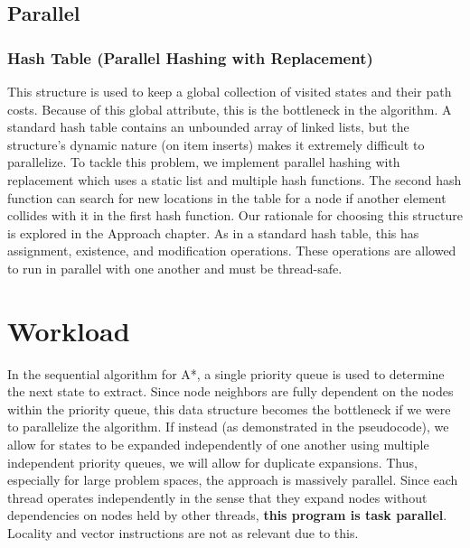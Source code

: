 \subsection{Parallel}
\subsubsection{Hash Table (Parallel Hashing with Replacement)\cite{paper}}
This structure is used to keep a global collection of visited states and their path costs. Because of this global attribute, this is the bottleneck in the algorithm. A standard hash table contains an unbounded array of linked lists, but the structure's dynamic nature (on item inserts) makes it extremely difficult to parallelize. To tackle this problem, we implement parallel hashing with replacement\cite{paper} which uses a static list and multiple hash functions. The second hash function can search for new locations in the table for a node if another element collides with it in the first hash function. Our rationale for choosing this structure is explored in the Approach chapter. As in a standard hash table, this has assignment, existence, and modification operations. These operations are allowed to run in parallel with one another and must be thread-safe.

\section{Workload}
In the sequential algorithm for A*, a single priority queue is used to determine the next state to extract. Since node neighbors are fully dependent on the nodes within the priority queue, this data structure becomes the bottleneck if we were to parallelize the algorithm. If instead (as demonstrated in the pseudocode), we allow for states to be expanded independently of one another using multiple independent priority queues, we will allow for duplicate expansions. Thus, especially for large problem spaces, the approach is massively parallel.\newline\newline
Since each thread operates independently in the sense that they expand nodes without dependencies on nodes held by other threads, \textbf{this program is task parallel}. Locality and vector instructions are not as relevant due to this.
